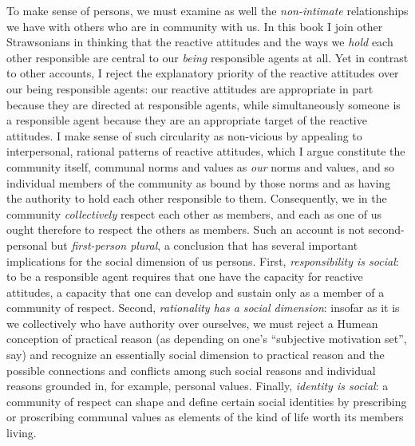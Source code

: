 \documentclass[11pt]{article}
\begin{document}
To make sense of persons, we must examine as well the \emph{non-intimate} relationships we have with others who are in community with us. In this book I join other Strawsonians in thinking that the reactive attitudes and the ways we \emph{hold} each other responsible are central to our \emph{being} responsible agents at all. Yet in contrast to other accounts, I reject the explanatory priority of the reactive attitudes over our being responsible agents: our reactive attitudes are appropriate in part because they are directed at responsible agents, while simultaneously someone is a responsible agent because they are an appropriate target of the reactive attitudes. I make sense of such circularity as non-vicious by appealing to interpersonal, rational patterns of reactive attitudes, which I argue constitute the community itself, communal norms and values as \emph{our} norms and values, and so individual members of the community as bound by those norms and as having the authority to hold each other responsible to them. Consequently, we in the community \emph{collectively} respect each other as members, and each as one of us ought therefore to respect the others as members. Such an account is not second-personal but \emph{first-person plural}, a conclusion that has several important implications for the social dimension of us persons. First, \emph{responsibility is social}: to be a responsible agent requires that one have the capacity for reactive attitudes, a capacity that one can develop and sustain only as a member of a community of respect. Second, \emph{rationality has a social dimension}: insofar as it is we collectively who have authority over ourselves, we must reject a Humean conception of practical reason (as depending on one's \enquote{subjective motivation set}, say) and recognize an essentially social dimension to practical reason and the possible connections and conflicts among such social reasons and individual reasons grounded in, for example, personal values. Finally, \emph{identity is social}: a community of respect can shape and define certain social identities by prescribing or proscribing communal values as elements of the kind of life worth its members living.

\subsubsection*{}%
\end{document}
